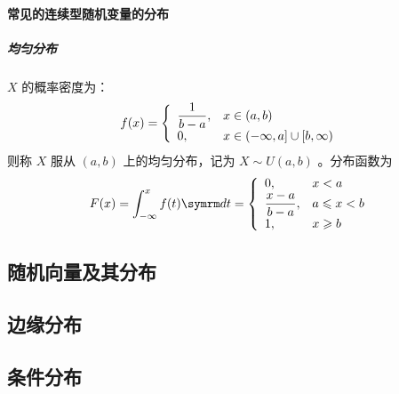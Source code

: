 \paragraph{常见的连续型随机变量的分布}

\subparagraph{均匀分布}  $ X $ 的概率密度为：
\begin{equation}
    f(x) = \left\{ \begin{array}{ll}
        \displaystyle{\frac{\displaystyle{1}}{\displaystyle{b-a}}}, & x \in (a,b) \\
        0, & x \in (-\infty, a] \cup [b, \infty)
    \end{array} \right.
\end{equation}
则称 $ X $ 服从 $ (a,b) $ 上的均匀分布，记为 $ X \sim U(a,b) $ 。分布函数为
\begin{equation}
    F(x) = \int_{-\infty}^x f(t) \diff t = \left\{ \begin{array}{ll}
        0, & x < a \\
        \ddfrac{x-a}{b-a}, & a \leqslant x < b  \\
        1, & x \geqslant b
    \end{array} \right.
\end{equation}

\subsection{随机向量及其分布}

\subsection{边缘分布}

\subsection{条件分布}